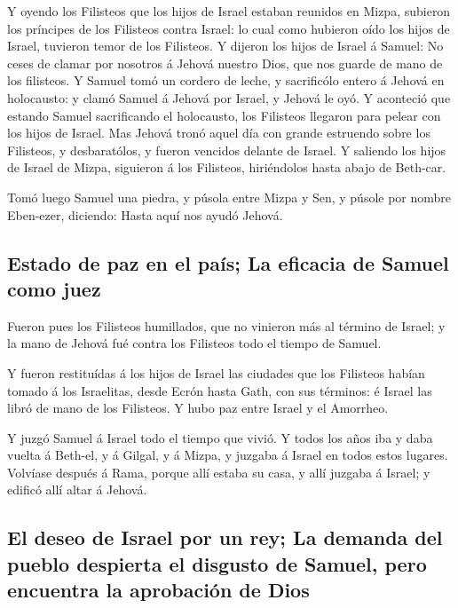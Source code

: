  Y oyendo los Filisteos que los hijos de Israel estaban
reunidos en Mizpa, subieron los príncipes de los Filisteos contra
Israel: lo cual como hubieron oído los hijos de Israel, tuvieron temor
de los Filisteos.  Y dijeron los hijos de Israel á Samuel:
No ceses de clamar por nosotros á Jehová nuestro Dios, que nos guarde de
mano de los filisteos.  Y Samuel tomó un cordero de leche,
y sacrificólo entero á Jehová en holocausto: y clamó Samuel á Jehová por
Israel, y Jehová le oyó.  Y aconteció que estando Samuel
sacrificando el holocausto, los Filisteos llegaron para pelear con los
hijos de Israel. Mas Jehová tronó aquel día con grande estruendo sobre
los Filisteos, y desbaratólos, y fueron vencidos delante de Israel.
 Y saliendo los hijos de Israel de Mizpa, siguieron á los
Filisteos, hiriéndolos hasta abajo de Beth-car.

 Tomó luego Samuel una piedra, y púsola entre Mizpa y
Sen, y púsole por nombre Eben-ezer, diciendo: Hasta aquí nos ayudó
Jehová.

\hypertarget{estado-de-paz-en-el-pauxeds-la-eficacia-de-samuel-como-juez}{%
\subsection{Estado de paz en el país; La eficacia de Samuel como
juez}\label{estado-de-paz-en-el-pauxeds-la-eficacia-de-samuel-como-juez}}

 Fueron pues los Filisteos humillados, que no vinieron
más al término de Israel; y la mano de Jehová fué contra los Filisteos
todo el tiempo de Samuel.

 Y fueron restituídas á los hijos de Israel las ciudades
que los Filisteos habían tomado á los Israelitas, desde Ecrón hasta
Gath, con sus términos: é Israel las libró de mano de los Filisteos. Y
hubo paz entre Israel y el Amorrheo.

 Y juzgó Samuel á Israel todo el tiempo que vivió.
 Y todos los años iba y daba vuelta á Beth-el, y á
Gilgal, y á Mizpa, y juzgaba á Israel en todos estos lugares.
 Volvíase después á Rama, porque allí estaba su casa, y
allí juzgaba á Israel; y edificó allí altar á Jehová.

\hypertarget{el-deseo-de-israel-por-un-rey-la-demanda-del-pueblo-despierta-el-disgusto-de-samuel-pero-encuentra-la-aprobaciuxf3n-de-dios}{%
\subsection{El deseo de Israel por un rey; La demanda del pueblo
despierta el disgusto de Samuel, pero encuentra la aprobación de
Dios}\label{el-deseo-de-israel-por-un-rey-la-demanda-del-pueblo-despierta-el-disgusto-de-samuel-pero-encuentra-la-aprobaciuxf3n-de-dios}}

